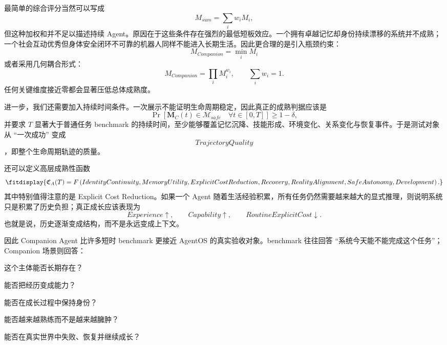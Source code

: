 最简单的综合评分当然可以写成
\[
M_{sum}
=
\sum_i w_i M_i,
\]
但这种加权和并不足以描述持续 Agent。原因在于这些条件存在强烈的最低短板效应。一个拥有卓越记忆却身份持续漂移的系统并不成熟；一个社会互动优秀但身体安全闭环不可靠的机器人同样不能进入长期生活。因此更合理的是引入瓶颈约束：
\[
\boxed{
M_{Companion}
=
\min_i M_i
}
\]
或者采用几何耦合形式：
\[
M_{Companion}
=
\prod_i M_i^{w_i},
\qquad
\sum_i w_i=1.
\]
任何关键维度接近零都会显著压低总体成熟度。

进一步，我们还需要加入持续时间条件。一次展示不能证明生命周期稳定，因此真正的成熟判据应该是
\[
\boxed{
\Pr
\left[
\mathbf M_C(t)\in\mathcal M_{safe}
\quad
\forall t\in[0,T]
\right]
\geq
1-\delta ,
}
\]
并要求 $T$ 显著大于普通任务 benchmark 的持续时间，至少能够覆盖记忆沉降、技能形成、环境变化、关系变化与恢复事件。于是测试对象从 ``一次成功'' 变成
\[
TrajectoryQuality
\]
，即整个生命周期轨迹的质量。

还可以定义高层成熟性函数
\[
\fitdisplay{
\mathfrak C_A(T)
=
F
\left(
IdentityContinuity,
MemoryUtility,
ExplicitCostReduction,
Recovery,
RealityAlignment,
SafeAutonomy,
Development
\right).
}
\]
其中特别值得注意的是 Explicit Cost Reduction。如果一个 Agent 随着生活经验积累，所有任务仍然需要越来越大的显式推理，则说明系统只是积累了历史负担；真正成长应该表现为
\[
Experience\uparrow,
\qquad
Capability\uparrow,
\qquad
RoutineExplicitCost\downarrow.
\]
也就是说，历史逐渐变成结构，而不是永远变成上下文。

因此 Companion Agent 比许多短时 benchmark 更接近 AgentOS 的真实验收对象。benchmark 往往回答 ``系统今天能不能完成这个任务''；Companion 场景则回答：

\begin{statementbox}
这个主体能否长期存在？
\end{statementbox}

\begin{statementbox}
能否把经历变成能力？
\end{statementbox}

\begin{statementbox}
能否在成长过程中保持身份？
\end{statementbox}

\begin{statementbox}
能否越来越熟练而不是越来越臃肿？
\end{statementbox}

\begin{statementbox}
能否在真实世界中失败、恢复并继续成长？
\end{statementbox}

